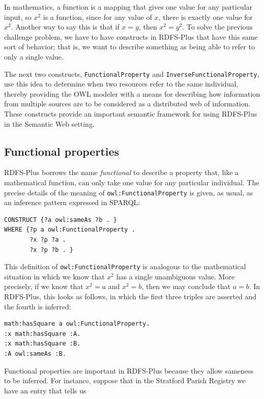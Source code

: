 In mathematics, a function is a mapping that gives one value for any
particular input, so $x^2$ is
a function, since for any value of $x$, there is exactly one value for $x^2$.
Another way to say this is that if
$x = y$, then $x^2 = y^2$. To solve the previous challenge problem, we have to
have constructs in RDFS-Plus that have this same sort of behavior; that
is, we want to describe something as being able to refer to only a
single value.

The next two constructs, \texttt{FunctionalProperty} and
\texttt{InverseFunctionalProperty}, use this idea to determine when two resources
refer to the same individual, thereby providing the OWL modeler with a
means for describing how information from multiple sources are to be
considered as a distributed web of information. These constructs provide
an important semantic framework for using RDFS-Plus in the Semantic Web
setting.

\subsection{Functional properties}

RDFS-Plus borrows the name \emph{functional} to describe a property that, like
a mathematical function, can only take one value for any particular
individual. The precise details of the meaning of \texttt{owl:FunctionalProperty}
is given, as usual, as an inference pattern expressed in SPARQL:

\begin{lstlisting}
CONSTRUCT {?a owl:sameAs ?b . }
WHERE {?p a owl:FunctionalProperty .
       ?x ?p ?a .
       ?x ?p ?b . }
\end{lstlisting}

This definition of \texttt{owl:FunctionalProperty} is analogous to the
mathematical situation in which we know that $x^2$ has a single unambiguous
value. More precisely, if we know that $x^2 = a$ and $x^2 = b$, then we may
conclude that $a = b$. In RDFS-Plus, this looks as follows, in which the
first three triples are asserted and the fourth is inferred:

\begin{lstlisting}
math:hasSquare a owl:FunctionalProperty.
:x math:hasSquare :A.
:x math:hasSquare :B.
:A owl:sameAs :B.
\end{lstlisting}

Functional properties are important in RDFS-Plus because they allow
sameness to be inferred. For instance, suppose that in the Stratford
Parish Registry we have an entry that tells us

